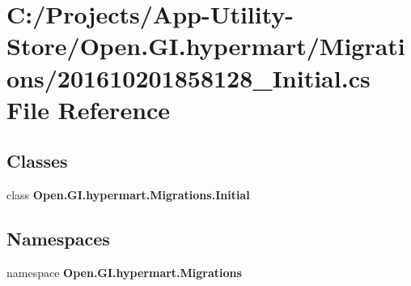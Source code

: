 \section{C\+:/\+Projects/\+App-\/\+Utility-\/\+Store/\+Open.G\+I.\+hypermart/\+Migrations/201610201858128\+\_\+\+Initial.cs File Reference}
\label{201610201858128___initial_8cs}
\subsection*{Classes}
\begin{DoxyCompactItemize}
\item 
class \textbf{ Open.\+G\+I.\+hypermart.\+Migrations.\+Initial}
\end{DoxyCompactItemize}
\subsection*{Namespaces}
\begin{DoxyCompactItemize}
\item 
namespace \textbf{ Open.\+G\+I.\+hypermart.\+Migrations}
\end{DoxyCompactItemize}
